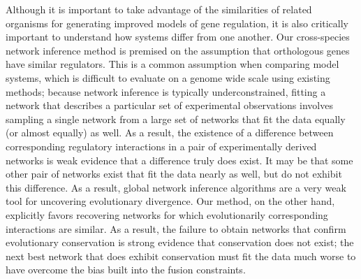\documentclass[11pt]{article}
\begin{document}
Although it is important to take advantage of the similarities of related organisms for generating improved models of gene regulation, it is also critically important to understand how systems differ from one another. Our cross-species network inference method is premised on the assumption that orthologous genes have similar regulators. This is a common assumption when comparing model systems, which is difficult to evaluate on a genome wide scale using existing methods; because network inference is typically underconstrained, fitting a network that describes a particular set of experimental observations involves sampling a single network from a large set of networks that fit the data equally (or almost equally) as well. As a result, the existence of a difference between corresponding regulatory interactions in a pair of experimentally derived networks is weak evidence that a difference truly does exist. It may be that some other pair of networks exist that fit the data nearly as well, but do not exhibit this difference. As a result, global network inference algorithms are a very weak tool for uncovering evolutionary divergence. Our method, on the other hand, explicitly favors recovering networks for which evolutionarily corresponding interactions are similar. As a result, the failure to obtain networks that confirm evolutionary conservation is strong evidence that conservation does not exist; the next best network that does exhibit conservation must fit the data much worse to have overcome the bias built into the fusion constraints.
\end{document}
